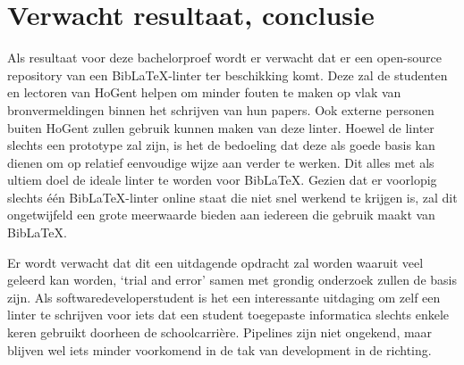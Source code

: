 \section{Verwacht resultaat, conclusie}%
\label{sec:verwachte_resultaten}

Als resultaat voor deze bachelorproef wordt er verwacht dat er een open-source repository van een BibLaTeX-linter ter beschikking komt. Deze zal de studenten en lectoren van HoGent helpen om minder fouten te maken op vlak van bronvermeldingen binnen het schrijven van hun papers. Ook externe personen buiten HoGent zullen gebruik kunnen maken van deze linter.
Hoewel de linter slechts een prototype zal zijn, is het de bedoeling dat deze als goede basis kan dienen om op relatief eenvoudige wijze aan verder te werken. Dit alles met als ultiem doel de ideale linter te worden voor BibLaTeX. Gezien dat er voorlopig slechts één BibLaTeX-linter online staat die niet snel werkend te krijgen is, zal dit ongetwijfeld een grote meerwaarde bieden aan iedereen die gebruik maakt van BibLaTeX.

Er wordt verwacht dat dit een uitdagende opdracht zal worden waaruit veel geleerd kan worden, `trial and error' samen met grondig onderzoek zullen de basis zijn. Als softwaredeveloperstudent is het een interessante uitdaging om zelf een linter te schrijven voor iets dat een student toegepaste informatica slechts enkele keren gebruikt doorheen de schoolcarrière. Pipelines zijn niet ongekend, maar blijven wel iets minder voorkomend in de tak van development in de richting.
